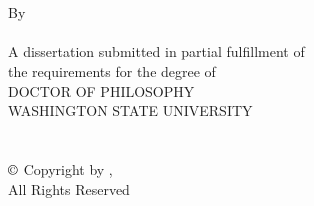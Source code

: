 \label{chap:title}

\begin{titlepage}
 	\begin{singlespace}
   		\begin{center}
			\MakeUppercase{\mytitleA}\\
			\bigskip
			\MakeUppercase{\mytitleB}\\
			\vspace{1.31in}
			By\\
			\bigskip
			\uppercase{\myname}\\
			\vspace{2.65in}
			A dissertation submitted in partial fulfillment of\\
			the requirements for the degree of\\
      		\bigskip
      		\uppercase{Doctor of Philosophy}\\
      		\bigskip \bigskip \bigskip
      		\uppercase{Washington State University}\\
      		\mydepartment\\
      		\bigskip
     		\uppercase{ \currentyear}\\
      		\bigskip \bigskip
      		$\copyright$ Copyright by \MakeUppercase{\myname}, \currentyear\\
      		All Rights Reserved
		\end{center}
	\end{singlespace}
\end{titlepage}

\newpage
